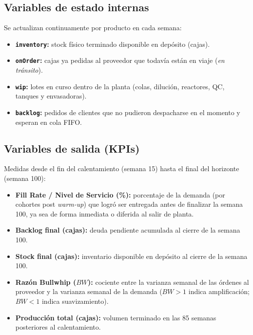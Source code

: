 \documentclass[11pt, a4paper]{article}
\begin{document}
\subsection{Variables de estado internas}
Se actualizan continuamente por producto en cada semana:
\begin{itemize}[leftmargin=0.5cm, itemsep=1pt]
    \item \textbf{\texttt{inventory}:} stock físico terminado disponible en depósito (cajas).
    \item \textbf{\texttt{onOrder}:} cajas ya pedidas al proveedor que todavía están en viaje (\textit{en tránsito}).
    \item \textbf{\texttt{wip}:} lotes en curso dentro de la planta (colas, dilución, reactores, QC, tanques y envasadoras).
    \item \textbf{\texttt{backlog}:} pedidos de clientes que no pudieron despacharse en el momento y esperan en cola FIFO.
\end{itemize}

\subsection{Variables de salida (KPIs)}
Medidas desde el fin del calentamiento (semana 15) hasta el final del horizonte (semana 100):
\begin{itemize}[leftmargin=0.5cm, itemsep=1pt]
    \item \textbf{Fill Rate / Nivel de Servicio (\%):} porcentaje de la demanda (por cohortes post \textit{warm-up}) que logró ser entregada antes de finalizar la semana 100, ya sea de forma inmediata o diferida al salir de planta.
    \item \textbf{Backlog final (cajas):} deuda pendiente acumulada al cierre de la semana 100.
    \item \textbf{Stock final (cajas):} inventario disponible en depósito al cierre de la semana 100.
    \item \textbf{Razón Bullwhip ($BW$):} cociente entre la varianza semanal de las órdenes al proveedor y la varianza semanal de la demanda ($BW > 1$ indica amplificación; $BW < 1$ indica suavizamiento).
    \item \textbf{Producción total (cajas):} volumen terminado en las 85 semanas posteriores al calentamiento.
\end{itemize}

\end{document}
